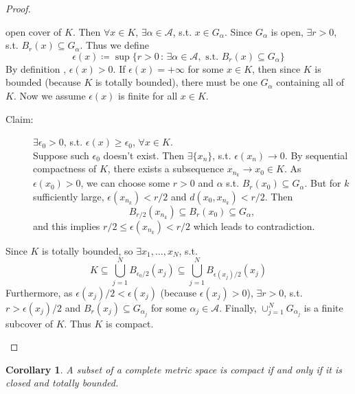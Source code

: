 \documentclass[12pt]{article}
\theoremstyle{plain}
\newtheorem*{corollary}{Corollary}
\theoremstyle{definition}
\begin{document}
\begin{proof}
\begin{description}
            open cover of $K$.
            Then $\forall x\in K$, $\exists \alpha\in\mathcal{A}$, s.t. $x\in
            G_\alpha$.
            Since $G_\alpha$ is open, $\exists r>0$, s.t. $B_r(x)\subseteq
            G_\alpha$.
            Thus we define
            $$\epsilon(x)\coloneqq \sup\{r>0\,:\,\exists\alpha\in\mathcal{A},
            \text{ s.t. } B_r(x)\subseteq G_\alpha\}$$
            By definition , $\epsilon(x)>0$.
            If $\epsilon(x)=+\infty$ for some $x\in K$, then since $K$ is
            bounded (because $K$ is totally bounded), there must be one
            $G_\alpha$ containing all of $K$.
            Now we assume $\epsilon(x)$ is finite for all $x\in K$.
            \begin{description}
                \item[Claim: ]$\exists \epsilon_0>0$, s.t. $\epsilon(x)\geq
                    \epsilon_0$, $\forall x\in K$.\\
                    Suppose such $\epsilon_0$ doesn't exist.
                    Then $\exists\{x_n\}$, s.t. $\epsilon(x_n)\rightarrow 0$.
                    By sequential compactness of $K$, there exists a subsequence
                    $x_{n_k}\rightarrow x_0\in K$.
                    As $\epsilon(x_0)>0$, we can choose some $r>0$ and $\alpha$
                    s.t. $B_r(x_0)\subseteq G_\alpha$.
                    But for $k$ sufficiently large,
                    $\epsilon(x_{n_k})<r/2$ and $d(x_0,x_{n_k})<r/2$.
                    Then
                    $$B_{r/2}(x_{n_k})\subseteq B_r(x_0)\subseteq G_\alpha,$$
                    and this implies $r/2\leq\epsilon(x_{n_k})<r/2$ which leads
                    to contradiction.
            \end{description}
            Since $K$ is totally bounded, so $\exists x_1,\ldots,x_N$, s.t.
            $$K\subseteq \bigcup\limits_{j=1}^N B_{\epsilon_0/2}(x_j)
            \subseteq \bigcup_{j=1}^N B_{\epsilon(x_j)/2}(x_j)$$
            Furthermore, as $\epsilon(x_j)/2<\epsilon(x_j)$ (because
            $\epsilon(x_j)>0$), $\exists r>0$, s.t. $r>\epsilon(x_j)/2$ and
            $B_r(x_j)\subseteq G_{\alpha_j}$ for some $\alpha_j\in\mathcal{A}$.
            Finally, $\cup_{j=1}^N G_{\alpha_j}$ is a finite subcover of $K$.
            Thus $K$ is compact.
    \end{description}
\end{proof}

\begin{corollary}
    A subset of a complete metric space is compact if and only if it is closed
    and totally bounded.
\end{corollary}
\end{document}

